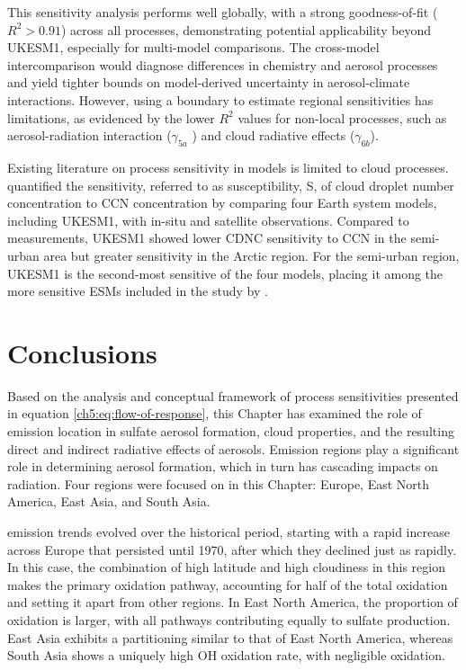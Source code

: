 This sensitivity analysis performs well globally, with a strong goodness-of-fit ($R^2 > 0.91$) across all processes, demonstrating potential applicability beyond UKESM1, especially for multi-model comparisons. The cross-model intercomparison would diagnose differences in chemistry and aerosol processes and yield tighter bounds on model-derived uncertainty in aerosol-climate interactions. However, using a boundary to estimate regional sensitivities has limitations, as evidenced by the lower $R^2$ values for non-local processes, such as aerosol-radiation interaction ($\gamma_{5a}$ ) and cloud radiative effects ($\gamma_{6b}$). 

Existing literature on process sensitivity in models is limited to cloud processes. \citet{virtanenHighSensitivityCloud2025} quantified the sensitivity, referred to as susceptibility, S, of cloud droplet number concentration to CCN concentration by comparing four Earth system models, including UKESM1, with in-situ and satellite observations. Compared to measurements, UKESM1 showed lower CDNC sensitivity to CCN in the semi-urban area but greater sensitivity in the Arctic region. For the semi-urban region, UKESM1 is the second-most sensitive of the four models, placing it among the more sensitive ESMs included in the study by \citet{virtanenHighSensitivityCloud2025}.


\section{Conclusions}

Based on the analysis and conceptual framework of process sensitivities presented in equation \ref{ch5:eq:flow-of-response}, this Chapter has examined the role of  emission location in sulfate aerosol formation, cloud properties, and the resulting direct and indirect radiative effects of aerosols. Emission regions play a significant role in determining aerosol formation, which in turn has cascading impacts on radiation. Four regions were focused on in this Chapter: Europe, East North America, East Asia, and South Asia. 

 emission trends evolved over the historical period, starting with a rapid increase across Europe that persisted until 1970, after which they declined just as rapidly. In this case, the combination of high latitude and high cloudiness in this region makes  the primary oxidation pathway, accounting for half of the total oxidation and setting it apart from other regions. In East North America, the proportion of  oxidation is larger, with all pathways contributing equally to sulfate production. East Asia exhibits a partitioning similar to that of East North America, whereas South Asia shows a uniquely high OH oxidation rate, with negligible  oxidation. 

